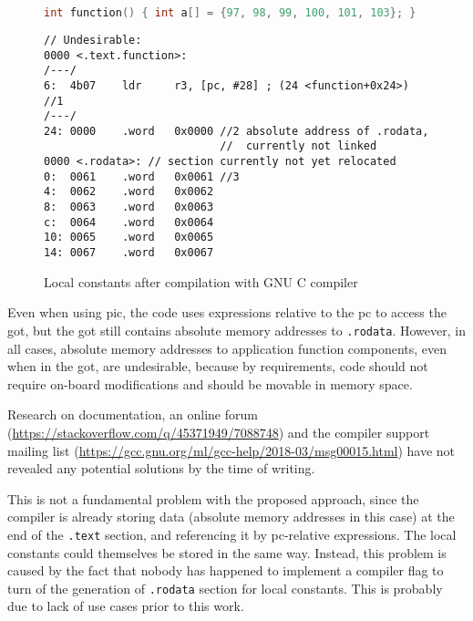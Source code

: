 \begin{figure} [h]
\begin{lstlisting}[language=C]
int function() { int a[] = {97, 98, 99, 100, 101, 103}; }
\end{lstlisting}
\begin{lstlisting}[style=asm]
// Undesirable:
0000 <.text.function>:
/---/
6:  4b07    ldr     r3, [pc, #28] ; (24 <function+0x24>) //1
/---/
24: 0000    .word   0x0000 //2 absolute address of .rodata,
                           //  currently not linked
0000 <.rodata>: // section currently not yet relocated
0:  0061    .word   0x0061 //3
4:  0062    .word   0x0062
8:  0063    .word   0x0063
c:  0064    .word   0x0064
10: 0065    .word   0x0065
14: 0067    .word   0x0067
\end{lstlisting}
\caption{Local constants after compilation with GNU C compiler}
\label{fig:rodata}
\end{figure}

Even when using \gls{pic}, the code uses expressions relative to the \gls{pc} to access the \gls{got}, but the \gls{got} still contains absolute memory addresses to \texttt{.rodata}. However, in all cases, absolute memory addresses to application function components, even when in the \gls{got}, are undesirable, because by requirements, code should not require on-board modifications and should be movable in memory space.

Research on documentation, an online forum (\url{https://stackoverflow.com/q/45371949/7088748}) and the compiler support mailing list (\url{https://gcc.gnu.org/ml/gcc-help/2018-03/msg00015.html}) have not revealed any potential solutions by the time of writing.

This is not a fundamental problem with the proposed approach, since the compiler is already storing data (absolute memory addresses in this case) at the end of the \texttt{.text} section, and referencing it by \gls{pc}-relative expressions. The local constants could themselves be stored in the same way. Instead, this problem is caused by the fact that nobody has happened to implement a compiler flag to turn of the generation of \texttt{.rodata} section for local constants. This is probably due to lack of use cases prior to this work.
